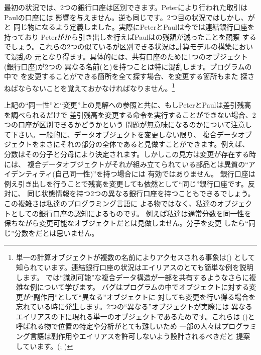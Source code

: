 \noindent
最初の状況では、2つの銀行口座は区別できます。Peterにより行われた取引はPaulの口座には
影響を与えません。逆も同じです。2つ目の状況ではしかし、がと
同じ物になるよう定義しました。実際にPeterとPaulは今では連結銀行口座を持っており
Peterがから引き出しを行えばPaulはの残額が減ったことを観察
するでしょう。これらの2つの似ているが区別できる状況は計算モデルの構築において混乱の
元となり得ます。具体的には、共有口座のために1つのオブジェクト(銀行口座)が2つの
異なる名前(と)を持つことは特に混乱します。プログラムの中で
を変更することができる箇所を全て探す場合、を変更する箇所もまた
探さねばならないことを覚えておかなければなりません。\footnote{
単一の計算オブジェクトが複数の名前によりアクセスされる事象は()
として知られています。連結銀行口座の状況はエイリアスのとても簡単な例を説明します。
では``識別可能''な複合データ構造が一部を共有するようなさらに複雑な例について学びます。
バグはプログラムの中でオブジェクトに対する変更が``副作用''として``異なる''オブジェクトに
対しても変更を行い得る場合を忘れている時に発生します。2つの``異なる''オブジェクトが実際には
異なるエイリアスの下に現れる単一のオブジェクトであるためです。これらは
()と呼ばれる物で位置の特定や分析がとても難しいため
一部の人々はプログラミング言語は副作用やエイリアスを許可しないよう設計されるべきだと
提案しています。(; )}

上記の``同一性''と``変更''上の見解への参照と共に、もしPeterとPaulは差引残高を調べられるだけで
差引残高を変更する命令を実行することができない場合、2つの口座が区別できるかどうかという
問題が無意味になるのかについて注意して下さい。一般的に、データオブジェクトを変更しない限り、
複合データオブジェクトをまさにそれの部分の全体であると見做すことができます。例えば、
分数はその分子と分母により決定されます。しかしこの見方は変更が存在する時には、
複合データオブジェクトがそれが組み立てられている部品とは異質の``アイデンティティ(自己同一性)''を持つ場合には
有効ではありません。
銀行口座は例え引き出しを行うことで残高を変更しても依然として``同じ''銀行口座です。反対に、
同じ状態情報を持つ2つの異なる銀行口座を持つこともできるでしょう。この複雑さは私達のプログラミング言語に
よる物ではなく、私達のオブジェクトとしての銀行口座の認知によるものです。
例えば私達は通常分数を同一性を保ちながら変更可能なオブジェクトだとは見做しません。分子を変更
したら``同じ''分数をだとは思いません。


